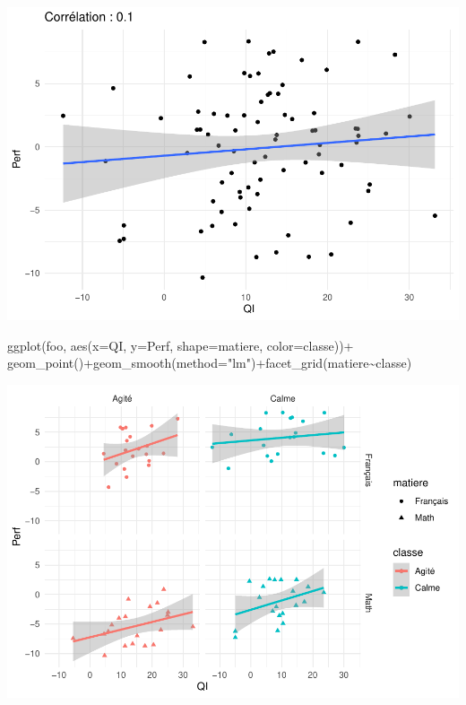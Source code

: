 \documentclass[
]{book}
\newenvironment{Shaded}{\begin{snugshade}}{\end{snugshade}}
\newcommand{\AttributeTok}[1]{\textcolor[rgb]{0.77,0.63,0.00}{#1}}
\newcommand{\FunctionTok}[1]{\textcolor[rgb]{0.00,0.00,0.00}{#1}}
\newcommand{\NormalTok}[1]{#1}
\newcommand{\SpecialCharTok}[1]{\textcolor[rgb]{0.00,0.00,0.00}{#1}}
\newcommand{\StringTok}[1]{\textcolor[rgb]{0.31,0.60,0.02}{#1}}
\begin{document}
\includegraphics{bookdown-demo_files/figure-latex/0918-1.pdf}

\begin{Shaded}
\begin{Highlighting}[]
\FunctionTok{ggplot}\NormalTok{(foo, }\FunctionTok{aes}\NormalTok{(}\AttributeTok{x=}\NormalTok{QI, }\AttributeTok{y=}\NormalTok{Perf, }\AttributeTok{shape=}\NormalTok{matiere, }\AttributeTok{color=}\NormalTok{classe))}\SpecialCharTok{+}
  \FunctionTok{geom\_point}\NormalTok{()}\SpecialCharTok{+}\FunctionTok{geom\_smooth}\NormalTok{(}\AttributeTok{method=}\StringTok{"lm"}\NormalTok{)}\SpecialCharTok{+}\FunctionTok{facet\_grid}\NormalTok{(matiere}\SpecialCharTok{\textasciitilde{}}\NormalTok{classe)}
\end{Highlighting}
\end{Shaded}

\includegraphics{bookdown-demo_files/figure-latex/0918-2.pdf}
\end{document}
